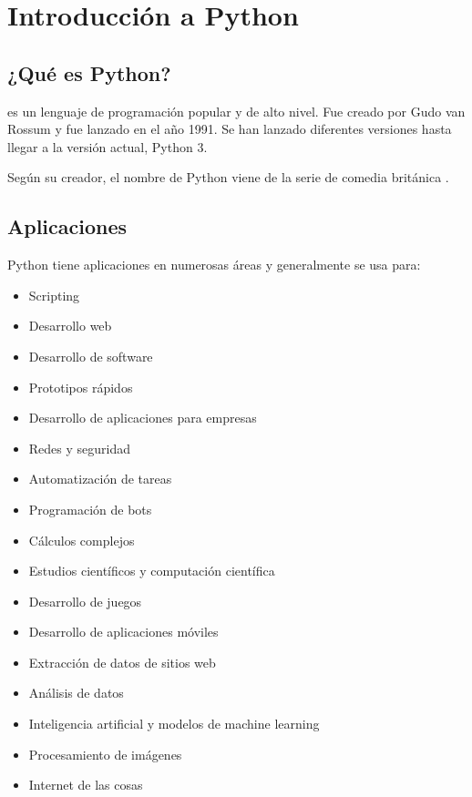 \chapter{Introducción a Python}

\section{¿Qué es Python?}

 es un lenguaje de programación popular y de alto nivel.
Fue creado por Gudo van Rossum y fue lanzado en el año 1991.
Se han lanzado diferentes versiones hasta llegar a la versión actual, Python 3.
\medskip

Según su creador, el nombre de Python viene de la serie de comedia británica .

\section{Aplicaciones}

Python tiene aplicaciones en numerosas áreas y generalmente se usa para:

\begin{itemize}
  \item Scripting
  
  \item Desarrollo web
  
  \item Desarrollo de software
  
  \item Prototipos rápidos
  
  \item Desarrollo de aplicaciones para empresas

  \item Redes y seguridad

  \item Automatización de tareas
  
  \item Programación de bots

  \item Cálculos complejos

  \item Estudios científicos y computación científica
  
  \item Desarrollo de juegos
  
  \item Desarrollo de aplicaciones móviles

  \item Extracción de datos de sitios web

  \item Análisis de datos

  \item Inteligencia artificial y modelos de machine learning

  \item Procesamiento de imágenes

  \item Internet de las cosas
  
\end{itemize}

